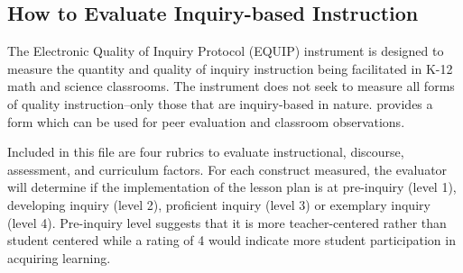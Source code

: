 \subsection*{How to Evaluate Inquiry-based Instruction}
The Electronic Quality of Inquiry Protocol (EQUIP) instrument is designed to measure
the quantity and quality of inquiry instruction being facilitated in K-12 math and science
classrooms. The instrument does not seek to measure all forms of quality instruction–only those
that are inquiry-based in nature. \textcite{4e2} provides a form which can be used for peer
evaluation and classroom observations.

Included in this file are four rubrics to evaluate instructional, discourse, assessment, and
curriculum factors. For each construct measured, the evaluator will determine if the implementation of the lesson plan is at pre-inquiry (level 1), developing inquiry (level 2),
proficient inquiry (level 3) or exemplary inquiry (level 4). Pre-inquiry level suggests that it is
more teacher-centered rather than student centered while a rating of 4 would indicate more
student participation in acquiring learning.
